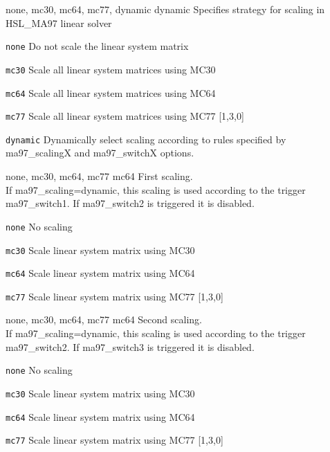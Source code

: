 %
{\ttfamily none, mc30, mc64, mc77, dynamic}%
{dynamic}%
{Specifies strategy for scaling in HSL\_MA97 linear solver}%
{\begin{list}{}{
\setlength{\parsep}{0em}
\setlength{\leftmargin}{5ex}
\setlength{\labelwidth}{2ex}
\setlength{\itemindent}{0ex}
\setlength{\topsep}{0pt}}
\item[\texttt{none}] Do not scale the linear system matrix
\item[\texttt{mc30}] Scale all linear system matrices using MC30
\item[\texttt{mc64}] Scale all linear system matrices using MC64
\item[\texttt{mc77}] Scale all linear system matrices using MC77 [1,3,0]
\item[\texttt{dynamic}] Dynamically select scaling according to rules specified by ma97\_scalingX and ma97\_switchX options.
\end{list}
}

%
{\ttfamily none, mc30, mc64, mc77}%
{mc64}%
{First scaling.\\
If ma97\_scaling=dynamic, this scaling is used according to the trigger ma97\_switch1. If ma97\_switch2 is triggered it is disabled.}%
{\begin{list}{}{
\setlength{\parsep}{0em}
\setlength{\leftmargin}{5ex}
\setlength{\labelwidth}{2ex}
\setlength{\itemindent}{0ex}
\setlength{\topsep}{0pt}}
\item[\texttt{none}] No scaling
\item[\texttt{mc30}] Scale linear system matrix using MC30
\item[\texttt{mc64}] Scale linear system matrix using MC64
\item[\texttt{mc77}] Scale linear system matrix using MC77 [1,3,0]
\end{list}
}

%
{\ttfamily none, mc30, mc64, mc77}%
{mc64}%
{Second scaling.\\
If ma97\_scaling=dynamic, this scaling is used according to the trigger ma97\_switch2. If ma97\_switch3 is triggered it is disabled.}%
{\begin{list}{}{
\setlength{\parsep}{0em}
\setlength{\leftmargin}{5ex}
\setlength{\labelwidth}{2ex}
\setlength{\itemindent}{0ex}
\setlength{\topsep}{0pt}}
\item[\texttt{none}] No scaling
\item[\texttt{mc30}] Scale linear system matrix using MC30
\item[\texttt{mc64}] Scale linear system matrix using MC64
\item[\texttt{mc77}] Scale linear system matrix using MC77 [1,3,0]
\end{list}
}

